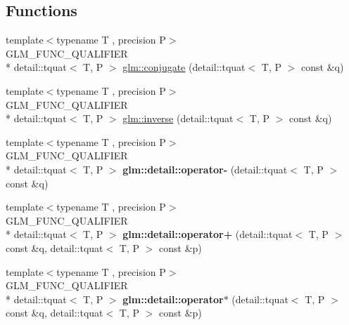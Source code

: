 \subsection*{Functions}
\begin{DoxyCompactItemize}
\item 
{\footnotesize template$<$typename T , precision P$>$ }\\G\-L\-M\-\_\-\-F\-U\-N\-C\-\_\-\-Q\-U\-A\-L\-I\-F\-I\-E\-R \\*
detail\-::tquat$<$ T, P $>$ \hyperlink{group__gtc__quaternion_gaf78006c47276b151777fc194cf11a688}{glm\-::conjugate} (detail\-::tquat$<$ T, P $>$ const \&q)
\item 
{\footnotesize template$<$typename T , precision P$>$ }\\G\-L\-M\-\_\-\-F\-U\-N\-C\-\_\-\-Q\-U\-A\-L\-I\-F\-I\-E\-R \\*
detail\-::tquat$<$ T, P $>$ \hyperlink{group__gtc__quaternion_ga6613ef61cb980a18f19ece5f421564da}{glm\-::inverse} (detail\-::tquat$<$ T, P $>$ const \&q)
\item 
\hypertarget{namespaceglm_1_1detail_aaeaeb4c634f2abcfe3c524db5e38d863}{{\footnotesize template$<$typename T , precision P$>$ }\\G\-L\-M\-\_\-\-F\-U\-N\-C\-\_\-\-Q\-U\-A\-L\-I\-F\-I\-E\-R \\*
detail\-::tquat$<$ T, P $>$ {\bfseries glm\-::detail\-::operator-\/} (detail\-::tquat$<$ T, P $>$ const \&q)}\label{namespaceglm_1_1detail_aaeaeb4c634f2abcfe3c524db5e38d863}

\item 
\hypertarget{namespaceglm_1_1detail_a80b78b61eccf89d7d4f0e5dbd7f93aec}{{\footnotesize template$<$typename T , precision P$>$ }\\G\-L\-M\-\_\-\-F\-U\-N\-C\-\_\-\-Q\-U\-A\-L\-I\-F\-I\-E\-R \\*
detail\-::tquat$<$ T, P $>$ {\bfseries glm\-::detail\-::operator+} (detail\-::tquat$<$ T, P $>$ const \&q, detail\-::tquat$<$ T, P $>$ const \&p)}\label{namespaceglm_1_1detail_a80b78b61eccf89d7d4f0e5dbd7f93aec}

\item 
\hypertarget{namespaceglm_1_1detail_ac01bc808c06043b6b7f321b39775a64c}{{\footnotesize template$<$typename T , precision P$>$ }\\G\-L\-M\-\_\-\-F\-U\-N\-C\-\_\-\-Q\-U\-A\-L\-I\-F\-I\-E\-R \\*
detail\-::tquat$<$ T, P $>$ {\bfseries glm\-::detail\-::operator$\ast$} (detail\-::tquat$<$ T, P $>$ const \&q, detail\-::tquat$<$ T, P $>$ const \&p)}\label{namespaceglm_1_1detail_ac01bc808c06043b6b7f321b39775a64c}


\end{DoxyCompactItemize}
